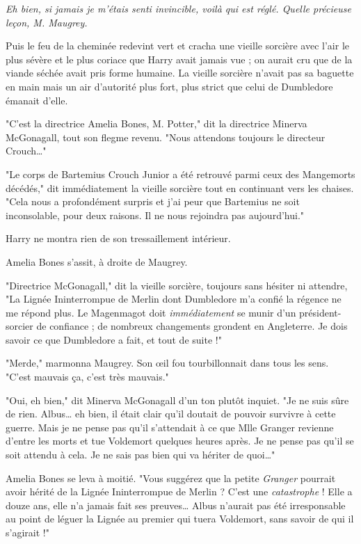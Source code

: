 \emph{Eh bien, si jamais je m'étais senti invincible, voilà qui est réglé. Quelle précieuse leçon, M. Maugrey.} 

Puis le feu de la cheminée redevint vert et cracha une vieille sorcière avec l'air le plus sévère et le plus coriace que Harry avait jamais vue ; on aurait cru que de la viande séchée avait pris forme humaine. La vieille sorcière n'avait pas sa baguette en main mais un air d'autorité plus fort, plus strict que celui de Dumbledore émanait d'elle.

"C'est la directrice Amelia Bones, M. Potter," dit la directrice Minerva McGonagall, tout son flegme revenu. "Nous attendons toujours le directeur Crouch…"

"Le corps de Bartemius Crouch Junior a été retrouvé parmi ceux des Mangemorts décédés," dit immédiatement la vieille sorcière tout en continuant vers les chaises. "Cela nous a profondément surpris et j'ai peur que Bartemius ne soit inconsolable, pour deux raisons. Il ne nous rejoindra pas aujourd'hui."

Harry ne montra rien de son tressaillement intérieur.

Amelia Bones s'assit, à droite de Maugrey.

"Directrice McGonagall," dit la vieille sorcière, toujours sans hésiter ni attendre, "La Lignée Ininterrompue de Merlin dont Dumbledore m'a confié la régence ne me répond plus. Le Magenmagot doit \emph{immédiatement}  se munir d'un président-sorcier de confiance ; de nombreux changements grondent en Angleterre. Je dois savoir ce que Dumbledore a fait, et tout de suite !"

"Merde," marmonna Maugrey. Son œil fou tourbillonnait dans tous les sens. "C'est mauvais ça, c'est très mauvais."

"Oui, eh bien," dit Minerva McGonagall d'un ton plutôt inquiet. "Je ne suis sûre de rien. Albus… eh bien, il était clair qu'il doutait de pouvoir survivre à cette guerre. Mais je ne pense pas qu'il s'attendait à ce que Mlle Granger revienne d'entre les morts et tue Voldemort quelques heures après. Je ne pense pas qu'il se soit attendu à cela. Je ne sais pas bien qui va hériter de quoi…"

Amelia Bones se leva à moitié. "Vous suggérez que la petite \emph{Granger}  pourrait avoir hérité de la Lignée Ininterrompue de Merlin ? C'est une \emph{catastrophe}  ! Elle a douze ans, elle n'a jamais fait ses preuves… Albus n'aurait pas été irresponsable au point de léguer la Lignée au premier qui tuera Voldemort, sans savoir de qui il s'agirait !"

